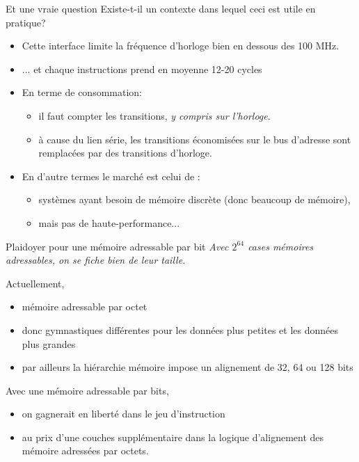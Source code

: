 \documentclass[slidetop,11pt,table]{beamer}
\begin{document}
\begin{frame}{Et une vraie question}
  Existe-t-il un contexte dans lequel ceci est utile en pratique?
  \begin{itemize}
  \item Cette interface limite la fréquence d'horloge bien en dessous des 100 MHz.
  \item ... et chaque instructions prend en moyenne 12-20 cycles
  \item En terme de consommation:
    \begin{itemize}
    \item il faut compter les transitions, \emph{y compris sur
        l'horloge}.
      
    \item à cause du lien série, les transitions économisées sur le bus d'adresse sont remplacées par  des transitions d'horloge. 
    \end{itemize}
    
  \item En d'autre termes le marché est celui de :
    \begin{itemize}
    \item systèmes ayant besoin de mémoire discrète (donc beaucoup de mémoire),  
    \item mais pas de haute-performance...
    \end{itemize}

  \end{itemize}
\end{frame}

\begin{frame}
\end{frame}

\begin{frame}{Plaidoyer pour une mémoire adressable par bit}
  \emph{Avec $2^{64}$  cases mémoires adressables, on se fiche bien de leur taille.}

  \vfill
  Actuellement,
  \begin{itemize}
  \item mémoire adressable par octet
  \item donc gymnastiques différentes pour les données plus petites et les données plus grandes
  \item par ailleurs la hiérarchie mémoire impose un alignement de 32, 64 ou 128 bits 
  \end{itemize}

  Avec une mémoire adressable par bits,
  \begin{itemize}
  \item on gagnerait en liberté dans le jeu d'instruction
  \item au prix d'une couches supplémentaire dans la logique d'alignement des mémoire adressées par octets.
  \end{itemize}
\end{frame}
\end{document}
